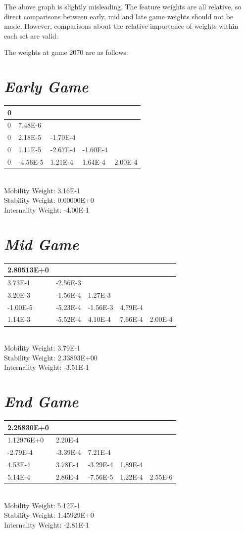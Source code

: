 \documentclass[10pt]{report}
\begin{document}
\begin{multicols}{2}
The above graph is slightly misleading. The feature weights are all relative, so direct comparisons between early, mid and late game weights should not be made. However, comparisons about the relative importance of weights within each set are valid.

The weights at game 2070 are as follows:
\section*{\emph{\textmd{Early Game}}}
\begin{tabular}{| l | l | l | l | l | }
\hline
 0&&&&\\
\hline
 0& 7.48E-6&&&\\
\hline
 0& 2.18E-5&-1.70E-4&&\\
\hline
 0& 1.11E-5&-2.67E-4&-1.60E-4&\\
\hline
 0&-4.56E-5& 1.21E-4& 1.64E-4& 2.00E-4\\
\hline
\end{tabular}
\medskip{}\\
Mobility Weight: 3.16E-1\\
Stability Weight: 0.00000E+0\\
Internality Weight: -4.00E-1
\section*{\emph{\textmd{Mid Game}}}
\begin{tabular}{| l | l | l | l | l | }
\hline
 2.80513E+0&&&&\\
\hline
 3.73E-1&-2.56E-3&&&\\
\hline
 3.20E-3&-1.56E-4& 1.27E-3&&\\
\hline
-1.00E-5&-5.23E-4&-1.56E-3& 4.79E-4&\\
\hline
 1.14E-3&-5.52E-4& 4.10E-4& 7.66E-4& 2.00E-4\\
\hline
\end{tabular}
\medskip{}\\
Mobility Weight: 3.79E-1\\
Stability Weight: 2.33893E+00\\
Internality Weight: -3.51E-1
\section*{\emph{\textmd{End Game}}}
\begin{tabular}{| l | l | l | l | l | }
\hline
 2.25830E+0&&&&\\
\hline
 1.12976E+0& 2.20E-4&&&\\
\hline
-2.79E-4&-3.39E-4& 7.21E-4&&\\
\hline
 4.53E-4& 3.78E-4&-3.29E-4& 1.89E-4&\\
\hline
 5.14E-4& 2.86E-4&-7.56E-5& 1.22E-4& 2.55E-6\\
\hline
\end{tabular}
\medskip{}\\
Mobility Weight: 5.12E-1\\
Stability Weight: 1.45929E+0\\
Internality Weight: -2.81E-1

\end{multicols}
\end{document}
